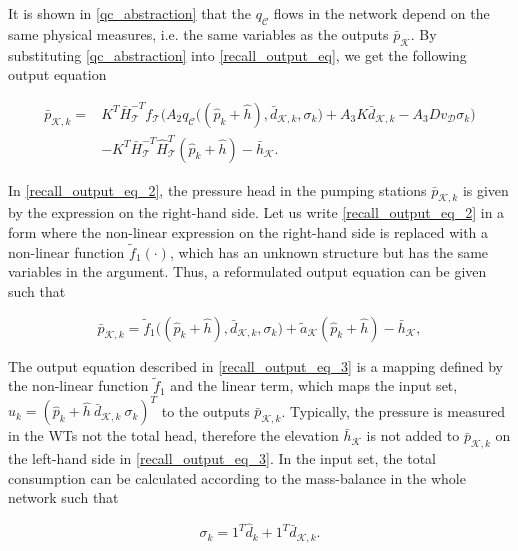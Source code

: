 It is shown in \eqref{qc_abstraction} that the $q_\mathcal{C}$ flows in the network depend on the same physical measures, i.e. the same variables as the outputs $\bar{p}_{\mathcal{K}}$. By substituting \eqref{qc_abstraction} into \eqref{recall_output_eq}, we get the following output equation

\vspace{-4mm}
\begin{align}
  \label{recall_output_eq_2}
      \bar{p}_{\mathcal{K},k}  = & \nonumber K^T \bar{H}^{-T}_{\mathcal{T}}f_{\mathcal{T}} \big (A_2 q_{\mathcal{C}}\big ((\hat{p}_k + \hat{h}),\bar{d}_{\mathcal{K},k}, \sigma_k \big) + A_3 K \bar{d}_{\mathcal{K},k} - A_3 D v_{\mathcal{D}} \sigma_k \big)   \\ &  - K^T\bar{H}^{-T}_{\mathcal{T}}\hat{H}^{T}_{\mathcal{T}} (\hat{p}_k + \hat{h}) - \bar{h}_{\mathcal{K}} .
\end{align}

\vspace{-4mm}
In \eqref{recall_output_eq_2}, the pressure head in the pumping stations $\bar{p}_{\mathcal{K},k}$ is given by the expression on the right-hand side. Let us write \eqref{recall_output_eq_2} in a form where the non-linear expression on the right-hand side is replaced with a non-linear function $\tilde{f}_1(\cdot)$, which has an unknown structure but has the same variables in the argument. Thus, a reformulated output equation can be given such that 

 \begin{equation}
  \label{recall_output_eq_3}
     \bar{p}_{\mathcal{K},k}  = \tilde{f}_1 \big((\hat{p}_k + \hat{h}),\bar{d}_{\mathcal{K},k}, \sigma_k\big) + \tilde{a}_{\mathcal{K}} (\hat{p}_k + \hat{h}) - \bar{h}_{\mathcal{K}}, 
\end{equation} 

The output equation described in \eqref{recall_output_eq_3} is a mapping defined by the non-linear function $\tilde{f}_1$ and the linear term, which maps the input set, $u_k = ( \hat{p}_k+\hat{h} \ \bar{d}_{\mathcal{K},k} \ \sigma_k )^T$ to the outputs $\bar{p}_{\mathcal{K},k} $. Typically, the pressure is measured in the WTs not the total head, therefore the elevation $\bar{h}_{\mathcal{K}}$ is not added to $\bar{p}_{\mathcal{K},k}$ on the left-hand side in \eqref{recall_output_eq_3}. In the input set, the total consumption can be calculated according to the mass-balance in the whole network such that

\begin{equation}
\label{massbalance_identification}
 \sigma_k = 1^T \hat{d}_k + 1^T \bar{d}_{\mathcal{K},k}.
\end{equation}

